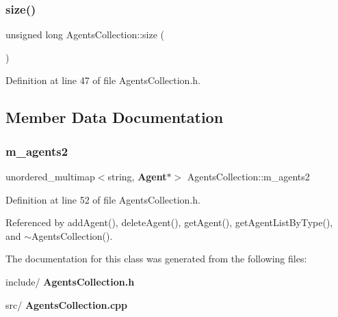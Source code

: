 \mbox{\label{class_agents_collection_a3226f7eb58b11623bdb353d8938f60d3}} 
\subsubsection{size()}
{\footnotesize\ttfamily unsigned long Agents\+Collection\+::size (\begin{DoxyParamCaption}{ }\end{DoxyParamCaption})\hspace{0.3cm}{\ttfamily [inline]}}



Definition at line 47 of file Agents\+Collection.\+h.



\subsection{Member Data Documentation}
\mbox{\label{class_agents_collection_a5ef5c11f043247a40554e4fabce6e23a}} 
\subsubsection{m\_agents2}
{\footnotesize\ttfamily unordered\+\_\+multimap$<$string, \textbf{ Agent}$\ast$$>$ Agents\+Collection\+::m\+\_\+agents2\hspace{0.3cm}{\ttfamily [private]}}



Definition at line 52 of file Agents\+Collection.\+h.



Referenced by add\+Agent(), delete\+Agent(), get\+Agent(), get\+Agent\+List\+By\+Type(), and $\sim$\+Agents\+Collection().



The documentation for this class was generated from the following files\+:\begin{DoxyCompactItemize}
\item 
include/\textbf{ Agents\+Collection.\+h}\item 
src/\textbf{ Agents\+Collection.\+cpp}\end{DoxyCompactItemize}
